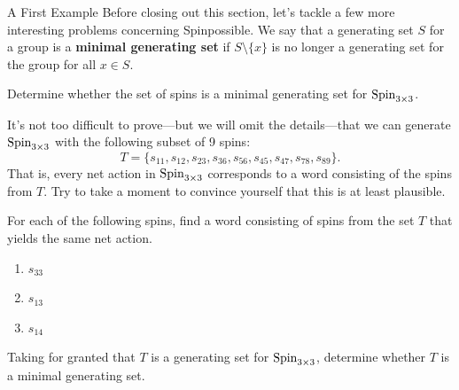 \begin{section}{A First Example}
Before closing out this section, let's tackle a few more interesting problems concerning Spinpossible. We say that a generating set $S$ for a group is a \textbf{minimal generating set} if $S\setminus\{x\}$ is no longer a generating set for the group for all $x\in S$.

\begin{problem}
Determine whether the set of spins is a minimal generating set for $\operatorname{Spin}_{3\times 3}$.
\end{problem}

It's not too difficult to prove---but we will omit the details---that we can generate $\operatorname{Spin}_{3\times 3}$ with the following subset of 9 spins:
\[
T=\{s_{11}, s_{12}, s_{23}, s_{36}, s_{56}, s_{45}, s_{47}, s_{78}, s_{89}\}.
\]
That is, every net action in $\operatorname{Spin}_{3\times 3}$ corresponds to a word consisting of the spins from $T$.  Try to take a moment to convince yourself that this is at least plausible.  

\begin{problem}
For each of the following spins, find a word consisting of spins from the set $T$ that yields the same net action.
\begin{enumerate}[label=\textrm{(\alph*)}]
\item $s_{33}$
\item $s_{13}$
\item $s_{14}$
\end{enumerate}
\end{problem}

\begin{problem}
Taking for granted that $T$ is a generating set for $\operatorname{Spin}_{3\times 3}$, determine whether $T$ is a minimal generating set.
\end{problem}

\end{section}


